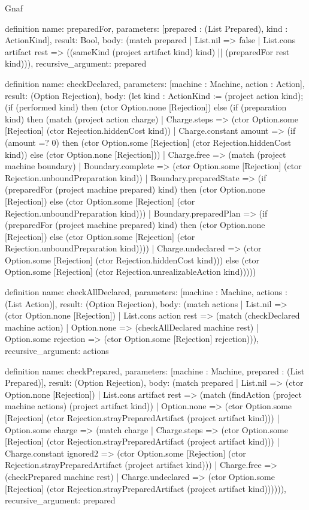 \begin{lexlean}{Gnaf}
\begin{semanticmodule}
definition{
  name: preparedFor,
  parameters: [prepared : (List Prepared), kind : ActionKind],
  result: Bool,
  body: (match prepared
    | List.nil => false
    | List.cons artifact rest => ((sameKind (project artifact kind) kind) || (preparedFor rest kind))),
  recursive_argument: prepared
}

definition{
  name: checkDeclared,
  parameters: [machine : Machine, action : Action],
  result: (Option Rejection),
  body: (let kind : ActionKind := (project action kind); (if (performed kind) then (ctor Option.none [Rejection]) else (if (preparation kind) then (match (project action charge)
    | Charge.steps => (ctor Option.some [Rejection] (ctor Rejection.hiddenCost kind))
    | Charge.constant amount => (if (amount =? 0) then (ctor Option.some [Rejection] (ctor Rejection.hiddenCost kind)) else (ctor Option.none [Rejection]))
    | Charge.free => (match (project machine boundary)
      | Boundary.complete => (ctor Option.some [Rejection] (ctor Rejection.unboundPreparation kind))
      | Boundary.preparedState => (if (preparedFor (project machine prepared) kind) then (ctor Option.none [Rejection]) else (ctor Option.some [Rejection] (ctor Rejection.unboundPreparation kind)))
      | Boundary.preparedPlan => (if (preparedFor (project machine prepared) kind) then (ctor Option.none [Rejection]) else (ctor Option.some [Rejection] (ctor Rejection.unboundPreparation kind))))
    | Charge.undeclared => (ctor Option.some [Rejection] (ctor Rejection.hiddenCost kind))) else (ctor Option.some [Rejection] (ctor Rejection.unrealizableAction kind)))))
}

definition{
  name: checkAllDeclared,
  parameters: [machine : Machine, actions : (List Action)],
  result: (Option Rejection),
  body: (match actions
    | List.nil => (ctor Option.none [Rejection])
    | List.cons action rest => (match (checkDeclared machine action)
      | Option.none => (checkAllDeclared machine rest)
      | Option.some rejection => (ctor Option.some [Rejection] rejection))),
  recursive_argument: actions
}

definition{
  name: checkPrepared,
  parameters: [machine : Machine, prepared : (List Prepared)],
  result: (Option Rejection),
  body: (match prepared
    | List.nil => (ctor Option.none [Rejection])
    | List.cons artifact rest => (match (findAction (project machine actions) (project artifact kind))
      | Option.none => (ctor Option.some [Rejection] (ctor Rejection.strayPreparedArtifact (project artifact kind)))
      | Option.some charge => (match charge
        | Charge.steps => (ctor Option.some [Rejection] (ctor Rejection.strayPreparedArtifact (project artifact kind)))
        | Charge.constant ignored2 => (ctor Option.some [Rejection] (ctor Rejection.strayPreparedArtifact (project artifact kind)))
        | Charge.free => (checkPrepared machine rest)
        | Charge.undeclared => (ctor Option.some [Rejection] (ctor Rejection.strayPreparedArtifact (project artifact kind)))))),
  recursive_argument: prepared
}


\end{semanticmodule}
\end{lexlean}
